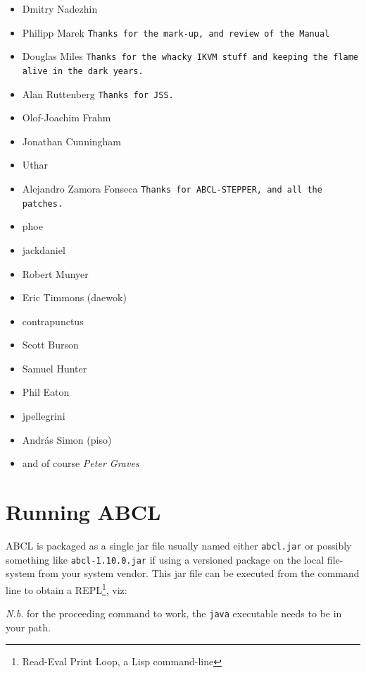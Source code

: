 \documentclass[10pt]{book}
\begin{document}
\begin{itemize}
\item Dmitry Nadezhin
\item Philipp Marek \texttt{Thanks for the mark-up, and review of the Manual}
\item Douglas Miles \texttt{Thanks for the whacky IKVM stuff and keeping the flame alive
  in the dark years.}
\item Alan Ruttenberg \texttt{Thanks for JSS.}
\item Olof-Joachim Frahm
\item Jonathan Cunningham
\item Uthar
\item Alejandro Zamora Fonseca \texttt{Thanks for ABCL-STEPPER, and all the patches.}
\item phoe
\item jackdaniel
\item Robert Munyer
\item Eric Timmons (daewok)
\item contrapunctus
\item Scott Burson
\item Samuel Hunter
\item Phil Eaton
\item jpellegrini  

  
\item Andr\'as Simon (piso)
\item and of course \emph{Peter Graves}
\end{itemize}


\chapter{Running ABCL}


\textsc{ABCL} is packaged as a single jar file usually named either
\texttt{abcl.jar} or possibly something like \texttt{abcl-1.10.0.jar} if
using a versioned package on the local file-system from your system
vendor.  This jar file can be executed from the command line to obtain a
\textsc{REPL}\footnote{Read-Eval Print Loop, a Lisp command-line}, viz:



\emph{N.b.} for the proceeding command to work, the \texttt{java}
executable needs to be in your path.
\end{document}
